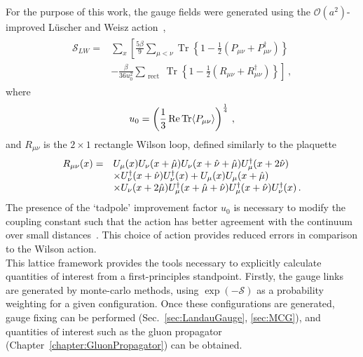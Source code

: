 For the purpose of this work, the gauge fields were generated using the $\mathcal{O}(a^2)$-improved L\"uscher and Weisz action~\cite{Luscher:1984xn}, 
%
\begin{align}
\begin{aligned} \mathcal{S} _ { LW } = &\sum_x \left[ \frac { 5 \beta } { 9 } \sum _ { \mu < \nu } \operatorname { Tr } \left\{ 1 - \frac { 1 } { 2 } \left( P _ { \mu \nu } + P _ { \mu \nu } ^ { \dagger } \right) \right\}\right. \\
& \left.- \frac { \beta } { 36 u _ { 0 } ^ { 2 } } \sum _ { \text { rect } } \operatorname { Tr } \left\{ 1 - \frac { 1 } { 2 } \left( R _ { \mu \nu } + R _ { \mu \nu } ^ { \dagger } \right) \right\}\right]\, , \end{aligned}
\end{align}
%
where
\begin{equation}
u_0 = \left(\frac{1}{3}\operatorname{ Re } \operatorname{Tr}\langle P_{\mu\nu} \rangle\right)^{\frac{1}{4}}\, ,
\end{equation}
and $R_{\mu\nu}$ is the $2\times 1$ rectangle Wilson loop, defined similarly to the plaquette 
\begin{align}
\begin{array} { r l } { R _ { \mu \nu } ( x ) = } & { U _ { \mu } ( x ) U _ { \nu } ( x + \hat { \mu } ) U _ { \nu } ( x + \hat { \nu } + \hat { \mu } ) U _ { \mu } ^ { \dagger } ( x + 2 \hat { \nu } ) } \\ { } & { \times U _ { \nu } ^ { \dagger } ( x + \hat { \nu } ) U _ { \nu } ^ { \dagger } ( x ) + U _ { \mu } ( x ) U _ { \mu } ( x + \hat { \mu } ) } \\ { } & { \times U _ { \nu } ( x + 2 \hat { \mu } ) U _ { \mu } ^ { \dagger } ( x + \hat { \mu } + \hat { \nu } ) U _ { \mu } ^ { \dagger } ( x + \hat { \nu } ) U _ { \nu } ^ { \dagger } ( x ) }\, . \end{array}
\end{align}
The presence of the `tadpole' improvement factor $u_0$ is necessary to modify the coupling constant such that the action has better agreement with the continuum over small distances~\cite{Lepage:1992xa}. This choice of action provides reduced errors in comparison to the Wilson action.\\

This lattice framework provides the tools necessary to explicitly calculate quantities of interest from a first-principles standpoint. Firstly, the gauge links are generated by monte-carlo methods, using $\exp\left(-\mathcal{S}\right)$ as a probability weighting for a given configuration. Once these configurations are generated, gauge fixing can be performed (Sec.~\ref{sec:LandauGauge}, \ref{sec:MCG}), and quantities of interest such as the gluon propagator (Chapter~\ref{chapter:GluonPropagator}) can be obtained.

